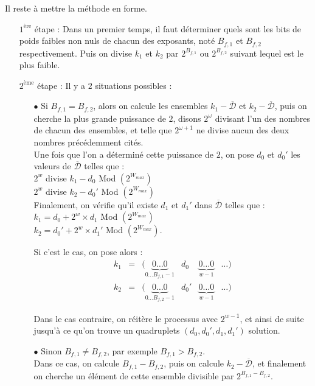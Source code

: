 \documentclass[12pt, a4paper]{memoir}
\newcommand{\dbarre}{\overline{\mathcal{D}}}
\begin{document}
  Il reste à mettre la méthode en forme.
  \begin{itemize}
   \item [$1^{\text{ère}}$ étape :] Dans un premier temps, il faut déterminer quels sont les bits de poids faibles non nuls
   de chacun des exposants, noté $B_{f,1}$ et $B_{f,2}$ respectivement. Puis on divise $k_1$ et $k_2$ par $2^{B_{f,1}}$ ou $2^{B_{f,2}}$ suivant lequel est le plus faible.
   \item [$2^{\text{ème}}$ étape :] Il y a $2$ situations possibles : \\
   \begin{itemize}
    \item [$\bullet$] Si $B_{f,1} = B_{f,2}$, alors on calcule les ensembles $k_1 - \dbarre$ et $k_2 - \dbarre$, puis on cherche
   la plus grande puissance de $2$, disons $2^{\omega}$ divisant l'un des nombres de chacun des ensembles,
   et telle que $2^{\omega+1}$ ne divise aucun des deux nombres précédemment cités. \\
   Une fois que l'on a déterminé cette puissance de $2$, on pose $d_0$ et $d_0'$ les valeurs de $\dbarre$ telles que : \\
   $2^w$ divise $k_1 - d_0$ Mod $(2^{W_{max}})$ \\
   $2^w$ divise $k_2 - d_0'$ Mod $(2^{W_{max}})$ \\
   Finalement, on vérifie qu'il existe $d_1$ et $d_1'$ dans $\dbarre$ telles que : \\
   $k_1 = d_0 + 2^w \times d_1$ Mod $(2^{W_{max}})$ \\
   $k_2 = d_0' + 2^w \times d_1'$ Mod $(2^{W_{max}})$.
   
   Si c'est le cas, on pose alors : \\
   $$\begin{array}{cccccc}
   k_1 & = & (\underbrace{0 \ldots 0}_{0 \ldots B_{f,1} - 1} & d_0 & \underbrace{0 \ldots 0}_{w-1} & \ldots) \\
   k_2 & = & (\underbrace{0 \ldots 0}_{0 \ldots B_{f,2} - 1} & d_0' & \underbrace{0 \ldots 0}_{w-1} & \ldots)
   \end{array}$$
   
   Dans le cas contraire, on réitère le processus avec $2^{w-1}$, et ainsi de suite jusqu'à ce qu'on trouve un quadruplets $(d_0,d_0',d_1,d_1')$ solution.
   \item [$\bullet$] Sinon $B_{f,1} \neq B_{f,2}$, par exemple $B_{f,1} > B_{f,2}$. \\
   Dans ce cas, on calcule $B_{f,1} - B_{f,2}$, puis on calcule $k_2 - \dbarre$, et finalement on cherche un élément de cette ensemble divisible par $2^{B_{f,1} - B_{f,2}}$.
   

\end{itemize}
\end{itemize}
\end{document}
